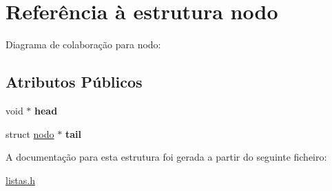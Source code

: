 \hypertarget{structnodo}{}\section{Referência à estrutura nodo}
\label{structnodo}


Diagrama de colaboração para nodo\+:
\subsection*{Atributos Públicos}
\begin{DoxyCompactItemize}
\item 
\mbox{\label{structnodo_a84e804ff33256ef9fc2667affcf0bed1}} 
void $\ast$ {\bfseries head}
\item 
\mbox{\label{structnodo_ae4cede7babb31055f5c770b71f0ff3e5}} 
struct \hyperlink{structnodo}{nodo} $\ast$ {\bfseries tail}
\end{DoxyCompactItemize}


A documentação para esta estrutura foi gerada a partir do seguinte ficheiro\+:\begin{DoxyCompactItemize}
\item 
\hyperlink{listas_8h}{listas.\+h}\end{DoxyCompactItemize}
